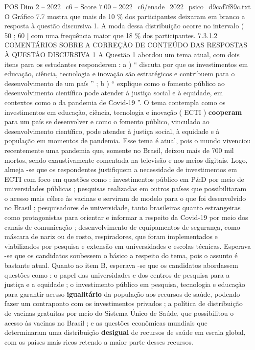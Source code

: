 \begin{textsample}{POS Dim 2 – 2022\_c6 – Score 7.00 – 2022\_c6/enade\_2022\_psico\_d9caf7f89c.txt}
O Gráfico 7.7 mostra que mais de 10 \% dos participantes deixaram em branco a resposta à questão discursiva 1.
A moda dessa distribuição ocorre no intervalo ( 50 ; 60 ] com uma frequência maior que 18 \% dos participantes. 7.3.1.2 COMENTÁRIOS SOBRE A CORREÇÃO DE CONTEÚDO DAS RESPOSTAS À QUESTÃO DISCURSIVA 1 A Questão 1 abordou um tema atual, com dois itens para os estudantes responderem : a ) “ discuta por que os investimentos em educação, ciência, tecnologia e inovação são estratégicos e contribuem para o desenvolvimento de um país ” ; b ) “ explique como o fomento público ao desenvolvimento científico pode atender à justiça social e à equidade, em contextos como o da pandemia de Covid-19 ”.
O tema contempla como os investimentos em educação, ciência, tecnologia e inovação ( ECTI ) \textbf{cooperam} para um país se desenvolver e como o fomento público, vinculado ao desenvolvimento científico, pode atender à justiça social, à equidade e à população em momentos de pandemia.
Esse tema é atual, pois o mundo vivenciou recentemente uma pandemia que, somente no Brasil, deixou mais de 700 mil mortos, sendo exaustivamente comentada na televisão e nos meios digitais.
Logo, almeja -se que os respondentes justifiquem a necessidade de investimentos em ECTI com foco em questões como : investimentos público em P\&D por meio de universidades públicas ; pesquisas realizadas em outros países que possibilitaram o acesso mais célere às vacinas e serviram de modelo para o que foi desenvolvido no Brasil ; pesquisadores de universidade, tanto brasileiras quanto estrangeiras como protagonistas para orientar e informar a respeito da Covid-19 por meio dos canais de comunicação ; desenvolvimento de equipamentos de segurança, como máscara de nariz ou de rosto, respiradores, que foram implementados e viabilizados por pesquisa e extensão em universidades e escolas técnicas.
Esperava -se que os candidatos soubessem o básico a respeito do tema, pois o assunto é bastante atual.
Quanto ao item B, esperava -se que os candidatos abordassem questões como : o papel das universidades e dos centros de pesquisa para a justiça e a equidade ; o investimento público em pesquisa, tecnologia e educação para garantir acesso \textbf{igualitário} da população aos recursos de saúde, podendo fazer um contraponto com os investimentos privados ; a política de distribuição de vacinas gratuitas por meio do Sistema Único de Saúde, que possibilitou o acesso às vacinas no Brasil ; e as questões econômicas mundiais que determinaram uma distribuição \textbf{desigual} de recursos de saúde em escala global, com os países mais ricos retendo a maior parte desses recursos.

\end{textsample}
